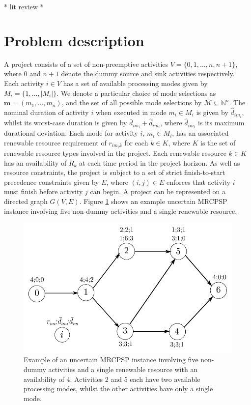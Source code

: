 \documentclass[a4paper,abstracton]{scrartcl}
\newcommand{\M}{{\mathcal{M}}}
\begin{document}
* lit review *

\section{Problem description}

A project consists of a set of non-preemptive activities $V=\{0,1,\dots,n,n+1\}$, where 0 and $n+1$ denote the dummy source and sink activities respectively. Each activity $i\in V$ has a set of available processing modes given by $M_i=\{1,\dots,|M_i|\}$. We denote a particular choice of mode selections as $\bm{m}=(m_1,\dots,m_n)$, and the set of all possible mode selections by $\M\subseteq \mathbb{N}^n$. The nominal duration of activity $i$ when executed in mode $m_i\in M_i$ is given by $\hat{d}_{im_i}$, whilst its worst-case duration is given by $\bar{d}_{im_i}+\hat{d}_{im_i}$, where $\hat{d}_{im_i}$ is its maximum durational deviation. Each mode for activity $i$, $m_i\in M_i$, has an associated renewable resource requirement of $r_{im_ik}$ for each $k\in K$, where $K$ is the set of renewable resource types involved in the project. Each renewable resource $k\in K$ has an availability of $R_{k}$ at each time period in the project horizon. As well as resource constraints, the project is subject to a set of strict finish-to-start precedence constraints given by $E$, where $(i,j)\in E$ enforces that activity $i$ must finish before activity $j$ can begin. A project can be represented on a directed graph $G(V,E)$. Figure \ref{fig:mrcpsp_network} shows an example uncertain MRCPSP instance involving five non-dummy activities and a single renewable resource.

\begin{figure}[h]
	\centering
	\includegraphics[scale=1]{mrcpsp_network.pdf}
	\caption{Example of an uncertain MRCPSP instance involving five non-dummy activities and a single renewable resource with an availability of 4. Activities 2 and 5 each have two available processing modes, whilst the other activities have only a single mode.}
	\label{fig:mrcpsp_network}
\end{figure}
\end{document}
